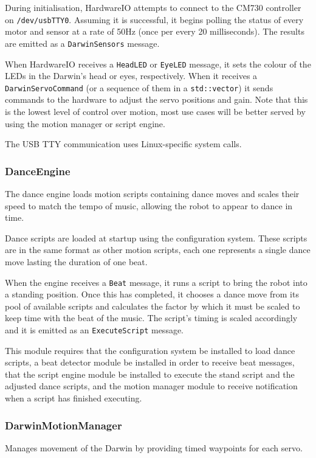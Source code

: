 \documentclass[english,12pt]{scrartcl}
\begin{document}
				During initialisation, HardwareIO attempts to connect to the CM730 controller on
				\texttt{/dev/usbTTY0}. Assuming it is successful, it begins polling the status of
				every motor and sensor at a rate of 50Hz (once per every 20 milliseconds). The
				results are emitted as a \texttt{DarwinSensors} message.
				
				When HardwareIO receives a \texttt{HeadLED} or \texttt{EyeLED} message, it sets
				the colour of the LEDs in the Darwin's head or eyes, respectively. 
				When it receives a \texttt{DarwinServoCommand} (or a sequence of them in a
				\texttt{std::vector}) it sends commands to the hardware to adjust the servo
				positions and gain. Note that this is the lowest level of control over motion,
				most use cases will be better served by using the motion manager or script engine.
				
				The USB TTY communication uses Linux-specific system calls.
				
			\subsubsection{DanceEngine}
				The dance engine loads motion scripts containing dance moves and scales their
				speed to match the tempo of music, allowing the robot to appear to dance in time.
				
				Dance scripts are loaded at startup using the configuration system. These scripts
				are in the same format as other motion scripts, each one represents a single dance
				move lasting the duration of one beat.
				
				When the engine receives a \texttt{Beat} message, it runs a script to bring the
				robot into a standing position. Once this has completed, it chooses a dance move
				from its pool of available scripts and calculates the factor by which it must be
				scaled to keep time with the beat of the music. The script's timing is scaled
				accordingly and it is emitted as an \texttt{ExecuteScript} message.
				
				This module requires that the configuration system be installed to load dance
				scripts, a beat detector module be installed in order to receive beat messages,
				that the script engine module be installed to execute the stand script and the
				adjusted dance scripts, and the motion manager module to receive notification
				when a script has finished executing.
				
				
			\subsubsection{DarwinMotionManager}
				Manages movement of the Darwin by providing timed waypoints for each servo.
				
\end{document}
